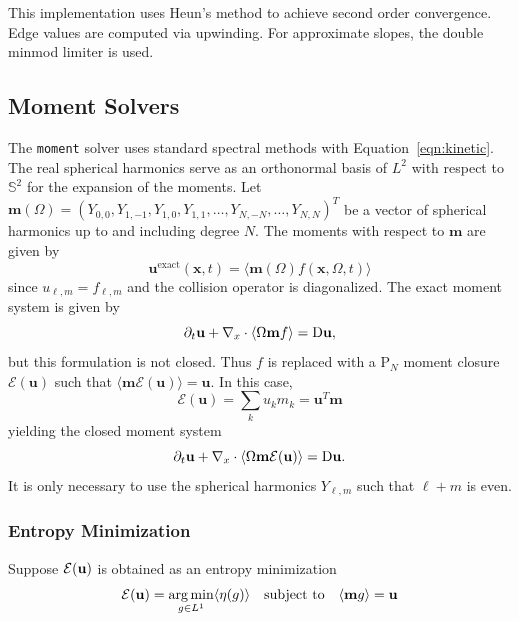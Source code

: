 \documentclass{article}
\newcommand{\integral}[1]{\ensuremath{\langle #1 \rangle}}
\newcommand{\closure}[1]{\ensuremath{\mathcal{E}(#1)}}
\newcommand{\twosphere}{\ensuremath{\mathbb{S}^2}\xspace}
\newcommand{\moment}{\texttt{moment}\xspace}
\begin{document}
This implementation uses Heun's method to achieve second order convergence. Edge values
are computed via upwinding. For approximate slopes, the double minmod limiter is used.

\subsection{Moment Solvers}
The \moment solver uses standard spectral methods with Equation~\ref{eqn:kinetic}. The real
spherical harmonics serve as an orthonormal basis of $L^2$ with respect to
\twosphere for the expansion of the moments. Let
$\mathbf{m}(\Omega) =
(Y_{0,0}, Y_{1,-1}, Y_{1,0}, Y_{1,1}, \dots, Y_{N,-N}, \dots, Y_{N,N})^T$
be a vector of spherical harmonics up to and including degree $N$. The moments
with respect to $\mathbf{m}$ are given by
\begin{equation}
    \mathbf{u}^{\textrm{exact}}(\mathbf{x}, t) =
    \integral{\mathbf{m}(\Omega) f(\mathbf{x}, \Omega, t)}
\end{equation}
since $u_{\ell,m} = f_{\ell,m}$ and the collision operator is diagonalized.
The exact moment system is given by
\begin{equation}
    \partial_t \mathbf{u} + \nabla_x \cdot \integral{\Omega\mathbf{m}f} =
    \Dif \mathbf{u},
\end{equation}
but this formulation is not closed. Thus $f$ is replaced with a $\mathrm{P}_N$
moment closure $\closure{\mathbf{u}}$ such that
$\integral{\mathbf{m}\closure{\mathbf{u}}} = \mathbf{u}$. In this case,
\begin{equation}
    \closure{\mathbf{u}} = \sum_k u_k m_k = \mathbf{u}^T \mathbf{m}
\end{equation}
yielding the closed moment system
\begin{equation}
    \partial_t \mathbf{u} + \nabla_x \cdot
    \integral{\Omega\mathbf{m}\closure{\mathbf{u}}} = \Dif \mathbf{u}.
\end{equation}
It is only necessary to use the spherical harmonics $Y_{\ell,m}$ such that
$\ell + m$ is even. 



\subsubsection{Entropy Minimization}
Suppose $\closure{\bu}$ is obtained as an entropy minimization
\begin{equation}
    \label{eqn:entropy}
    \mathcal{E}(\mathbf{u}) = \argmin_{g \in L^1} \integral{\eta(g)} \quad
    \textnormal{subject to} \quad \integral{\mathbf{m}g} = \mathbf{u}
\end{equation}
\end{document}
